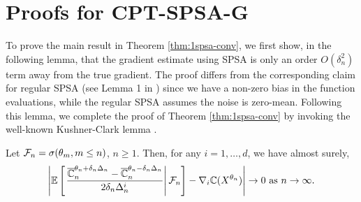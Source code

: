 \section{Proofs for CPT-SPSA-G}
\label{appendix:1spsa}

To prove the main result in Theorem \ref{thm:1spsa-conv}, we first show, in the following lemma, that the gradient estimate using SPSA is only an order $O(\delta_n^2)$ term away from the true gradient. The proof differs from the corresponding claim for regular SPSA (see Lemma 1 in \cite{spall}) since we have a non-zero bias in the function evaluations, while the regular SPSA assumes the noise is zero-mean. Following this lemma, we complete the proof of Theorem \ref{thm:1spsa-conv} by invoking the well-known Kushner-Clark lemma \cite{kushner-clark}.

\begin{lemma}
\label{lemma:1spsa-bias}
Let $\mathcal{F}_n = \sigma(\theta_m,m\le n)$, $n\ge 1$.
Then, for any $i = 1,\ldots,d$, we have almost surely,  
\begin{align}
\left| \mathbb{E}\left[\left.\dfrac{\overline {\mathbb{C}}_n^{\theta_n+\delta_n \Delta_n} -\overline {\mathbb{C}}_n^{\theta_n-\delta_n \Delta_n}}{2 \delta_n \Delta_n^{i}}\right| \mathcal{F}_n \right] - \nabla_i \mathbb{C}(X^{\theta_n}) \right| \rightarrow 0 \text{ as } n\rightarrow\infty.
\end{align} 
\end{lemma}
